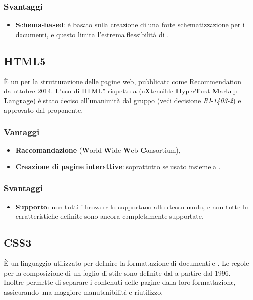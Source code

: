 \subsubsection{Svantaggi}
\begin{itemize}
\item \textbf{Schema-based}: \`e basato sulla creazione di una forte schematizzazione per i documenti, e questo limita l'estrema flessibilità di .
\end{itemize}

\subsection{HTML5}
\`E un  per la strutturazione delle pagine web, pubblicato come  Recommendation da ottobre 2014. L'uso di HTML5 rispetto a  (e\textbf{X}tensible \textbf{H}yper\textbf{T}ext \textbf{M}arkup \textbf{L}anguage) \`e stato deciso all'unanimit\`a dal gruppo (vedi decisione \textit{RI-1403-2}) e approvato dal proponente.
\subsubsection{Vantaggi}
\begin{itemize}
\item \textbf{Raccomandazione } (\textbf{W}orld \textbf{W}ide \textbf{W}eb \textbf{C}onsortium),
\item \textbf{Creazione di pagine interattive}: soprattutto se usato insieme a .
\end{itemize}
\subsubsection{Svantaggi}
\begin{itemize}
\item \textbf{Supporto}: non tutti i browser lo supportano allo stesso modo, e non tutte le caratteristiche definite sono ancora completamente supportate.
\end{itemize}

\subsection{CSS3}
\`E un linguaggio utilizzato per definire la formattazione di documenti  e . Le regole per la composizione di un foglio di stile  sono definite dal  a partire dal 1996. Inoltre permette di separare i contenuti delle pagine  dalla loro formattazione, assicurando una maggiore manutenibilit\`a e riutilizzo.
